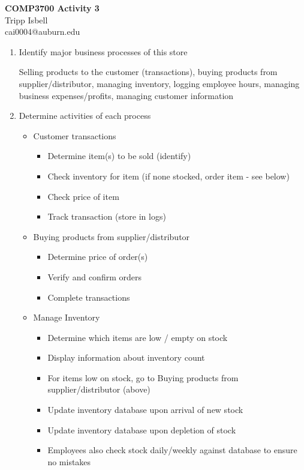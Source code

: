 \documentclass{letter}
\begin{document}
\begin{center}
\textbf{COMP3700 Activity 3}\\
Tripp Isbell\\
cai0004@auburn.edu
\end{center}

\begin{enumerate}
	\item Identify major business processes of this store
	
	Selling products to the customer (transactions), buying products from supplier/distributor, managing inventory, logging employee hours,  managing business expenses/profits, managing customer information
	
	\item Determine activities of each process
	
	\begin{itemize}
		\item Customer transactions
		\begin{itemize} 
			\item Determine item(s) to be sold (identify)
			\item Check inventory for item (if none stocked, order item - see below)
			\item Check price of item
			\item Track transaction (store in logs)
		\end{itemize}
		\item Buying products from supplier/distributor
		\begin{itemize}
			\item Determine price of order(s)
			\item Verify and confirm orders
			\item Complete transactions
		\end{itemize}
		\item Manage Inventory
		\begin{itemize}
			\item Determine which items are low / empty on stock
			\item Display information about inventory count
			\item For items low on stock, go to Buying products from supplier/distributor (above)
			\item Update inventory database upon arrival of new stock
			\item Update inventory database upon depletion of stock
			\item Employees also check stock daily/weekly against database to ensure no mistakes

\end{itemize}
\end{itemize}
\end{enumerate}
\end{document}
